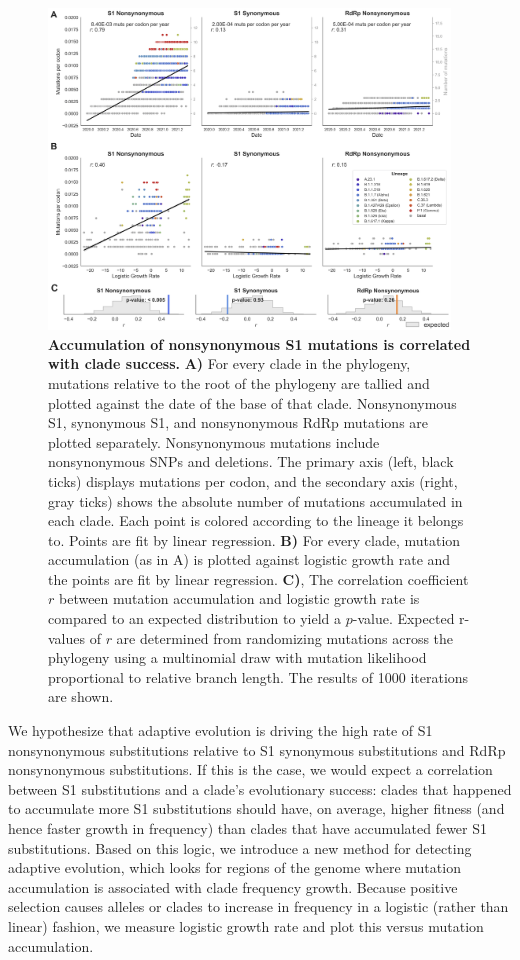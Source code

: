 \documentclass[11pt,oneside,letterpaper]{article}
\begin{document}
\begin{figure}[h!]
	\centerline{\includegraphics[width=0.95\textwidth]{fig1.png}}
	\caption{\textbf{Accumulation of nonsynonymous S1 mutations is correlated with clade success.}
	\textbf{A)} For every clade in the phylogeny, mutations relative to the root of the phylogeny are tallied and plotted against the date of the base of that clade. Nonsynonymous S1, synonymous S1, and nonsynonymous RdRp mutations are plotted separately. Nonsynonymous mutations include nonsynonymous SNPs and deletions. The primary axis (left, black ticks) displays mutations per codon, and the secondary axis (right, gray ticks) shows the absolute number of mutations accumulated in each clade. Each point is colored according to the lineage it belongs to. Points are fit by linear regression. \textbf{B)} For every clade, mutation accumulation (as in A) is plotted against logistic growth rate and the points are fit by linear regression. \textbf{C)}, The correlation coefficient $r$ between mutation accumulation and logistic growth rate is compared to an expected distribution to yield a $p$-value. Expected r-values of $r$ are determined from randomizing mutations across the phylogeny using a multinomial draw with mutation likelihood proportional to relative branch length. The results of 1000 iterations are shown.
	}
	\label{fig:fig1}
\end{figure}

We hypothesize that adaptive evolution is driving the high rate of S1 nonsynonymous substitutions relative to S1 synonymous substitutions and RdRp nonsynonymous substitutions. If this is the case, we would expect a correlation between S1 substitutions and a clade’s evolutionary success: clades that happened to accumulate more S1 substitutions should have, on average, higher fitness (and hence faster growth in frequency) than clades that have accumulated fewer S1 substitutions. Based on this logic, we introduce a new method for detecting adaptive evolution, which looks for regions of the genome where mutation accumulation is associated with clade frequency growth. Because positive selection causes alleles or clades to increase in frequency in a logistic (rather than linear) fashion, we measure logistic growth rate and plot this versus mutation accumulation.
\end{document}
